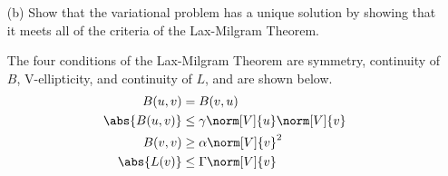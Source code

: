 \documentclass[11pt, titlepage]{article}
\begin{document}
\begin{enumerate}
\begin{enumerate}
      \item[(b)]
        Show that the variational problem has a unique solution by showing that
        it meets all of the criteria of the Lax-Milgram Theorem.

        The four conditions of the Lax-Milgram Theorem are symmetry, continuity
        of $B$, V-ellipticity, and continuity of $L$, and are shown below.
        \begin{align*}
          B(u, v) &= B(v, u) \\
          \abs{B(u, v)} &\le \gamma \norm[V]{u} \norm[V]{v} \\
          B(v, v) &\ge \alpha \norm[V]{v}^2 \\
          \abs{L(v)} &\le \Gamma \norm[V]{v}
        \end{align*}


\end{enumerate}
\end{enumerate}
\end{document}
